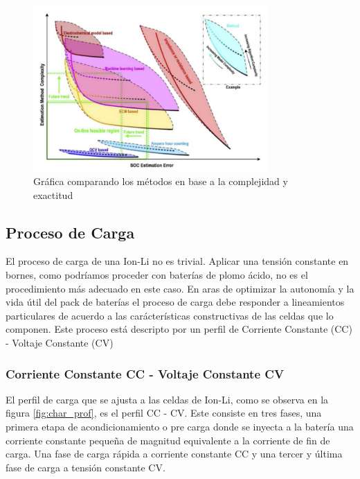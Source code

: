 \documentclass[10pt,a4paper]{article}
\begin{document}
\begin{figure}[h!]
    \begin{center}
        \includegraphics[width=0.8\textwidth]{comparisson_soc.png}
        \caption{Gr\'afica comparando los m\'etodos en base a la complejidad y
        exactitud}
        \label{comp_error_soc}
    \end{center}
\end{figure}

\subsection{Proceso de Carga}\label{sec:tecnica_carga}

El proceso de carga de una \acrfull{Ion-Li} no es trivial. Aplicar una tensión
constante en  bornes, como podríamos proceder con baterías de plomo ácido, no es
el procedimiento más adecuado en este caso. En aras de optimizar la autonomía y
la vida útil del pack de baterías el proceso de carga debe responder a
lineamientos particulares de acuerdo a las carácterísticas constructivas de las
celdas que lo componen. Este proceso est\'a descripto por un perfil de Corriente
Constante (CC) - Voltaje Constante (CV)

\subsubsection{Corriente Constante CC - Voltaje Constante CV}

El perfil de carga que se ajusta a las celdas de \acrshort{Ion-Li}, como se
observa en la figura \ref{fig:char_prof}, es el perfil \acrshort{CC} -
\acrshort{CV}. Este consiste en tres fases, una primera etapa de
acondicionamiento o pre carga donde se inyecta a la batería una corriente
constante pequeña de magnitud equivalente a la corriente de fin de carga. Una
fase de carga rápida a corriente constante \acrshort{CC} y una tercer y última
fase de carga a tensión constante \acrshort{CV}.
\end{document}
